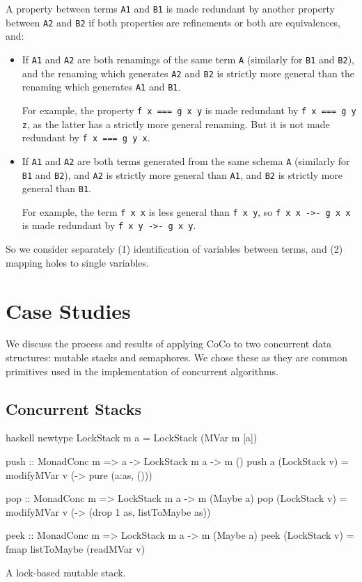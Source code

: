 A property between terms \verb|A1| and \verb|B1| is made redundant by
another property between \verb|A2| and \verb|B2| if both properties
are refinements or both are equivalences, and:

\begin{itemize}
\item If \verb|A1| and \verb|A2| are both renamings of the same term
  \verb|A| (similarly for \verb|B1| and \verb|B2|), and the renaming
  which generates \verb|A2| and \verb|B2| is strictly more general
  than the renaming which generates \verb|A1| and \verb|B1|.

  For example, the property \verb|f x === g x y| is made redundant by
  \verb|f x === g y z|, as the latter has a strictly more general
  renaming.  But it is not made redundant by \verb|f x === g y x|.

\item If \verb|A1| and \verb|A2| are both terms generated from the
  same schema \verb|A| (similarly for \verb|B1| and \verb|B2|), and
  \verb|A2| is strictly more general than \verb|A1|, and \verb|B2| is
  strictly more general than \verb|B1|.

  For example, the term \verb|f x x| is less general than \verb|f x y|,
  so \verb|f x x ->- g x x| is made redundant by
  \verb|f x y ->- g x y|.
\end{itemize}

So we consider separately (1) identification of variables between
terms, and (2) mapping holes to single variables.

\section{Case Studies}
\label{sec:coco-cases}

We discuss the process and results of applying CoCo to two concurrent
data structures: mutable stacks and semaphores.  We chose these as
they are common primitives used in the implementation of concurrent
algorithms.

\subsection{Concurrent Stacks}
\label{sec:coco-cases-stack}

\begin{listing}
\centering
\begin{cminted}{haskell}
newtype LockStack m a = LockStack (MVar m [a])

push :: MonadConc m => a -> LockStack m a -> m ()
push a (LockStack v) = modifyMVar v (\as -> pure (a:as, ()))

pop :: MonadConc m => LockStack m a -> m (Maybe a)
pop (LockStack v) = modifyMVar v (\as -> (drop 1 as, listToMaybe as))

peek :: MonadConc m => LockStack m a -> m (Maybe a)
peek (LockStack v) = fmap listToMaybe (readMVar v)
\end{cminted}
\caption{A lock-based mutable stack.}\label{lst:lockstack}
\end{listing}

